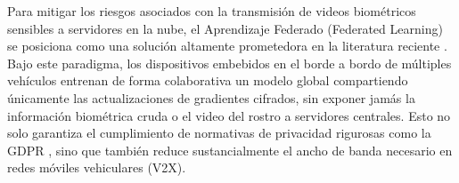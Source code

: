 Para mitigar los riesgos asociados con la transmisión de videos biométricos sensibles a servidores en la nube, el Aprendizaje Federado (Federated Learning) se posiciona como una solución altamente prometedora en la literatura reciente \cite{ijaradar2025datadriven, wang2025application}. Bajo este paradigma, los dispositivos embebidos en el borde a bordo de múltiples vehículos entrenan de forma colaborativa un modelo global compartiendo únicamente las actualizaciones de gradientes cifrados, sin exponer jamás la información biométrica cruda o el video del rostro a servidores centrales. Esto no solo garantiza el cumplimiento de normativas de privacidad rigurosas como la GDPR \cite{kumar2025smart, kalwa2025unusual}, sino que también reduce sustancialmente el ancho de banda necesario en redes móviles vehiculares (V2X).
